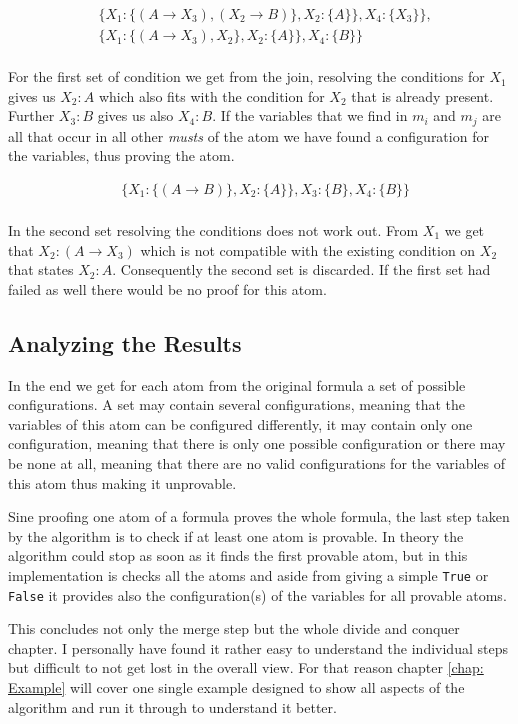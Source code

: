 \begin{align*}
	& \{	X_1: \{(A \rightarrow X_3), (X_2 \rightarrow B)\}, 
						X_2: \{A\}\}, 
						X_4: \{X_3\}\},\\
					& \{X_1: \{(A \rightarrow X_3), X_2\},
						X_2: \{A\}\}, 
						X_4: \{B\}\}\\
\end{align*}



For the first set of condition we get from the join, resolving the conditions for $X_1$ gives us $X_2:A$ which also fits with the condition for $X_2$ that is already present. Further $X_3: B$ gives us also $X_4: B$. If the variables that we find in $m_i$ and $m_j$ are all that occur in all other \emph{musts} of the atom we have found a configuration for the variables, thus proving the atom.

\begin{align*}
	& \{X_1: \{(A \rightarrow B)\}, X_2: \{A\}\}, X_3: \{B\}, X_4: \{B\}\}\\
\end{align*}

In the second set resolving the conditions does not work out. From $X_1$ we get that $X_2: (A \rightarrow X_3)$ which is not compatible with the existing condition on $X_2$ that states $X_2: A$. Consequently the second set is discarded. If the first set had failed as well there would be no proof for this atom.


\subsection{Analyzing the Results}
In the end we get for each atom from the original formula a set of possible configurations. A set may contain several configurations, meaning that the variables of this atom can be configured differently, it may contain only one configuration, meaning that there is only one possible configuration or there may be none at all, meaning that there are no valid configurations for the variables of this atom thus making it unprovable.

Sine proofing one atom of a formula proves the whole formula, the last step taken by the algorithm is to check if at least one atom is provable. In theory the algorithm could stop as soon as it finds the first provable atom, but in this implementation is checks all the atoms and aside from giving a simple \texttt{True} or \texttt{False} it provides also the configuration(s) of the variables for all provable atoms.



\bigskip
\par This concludes not only the merge step but the whole divide and conquer chapter. I personally have found it rather easy to understand the individual steps but difficult to not get lost in the overall view. For that reason chapter \ref{chap: Example} will cover one single example designed to show all aspects of the algorithm and run it through to understand it better.